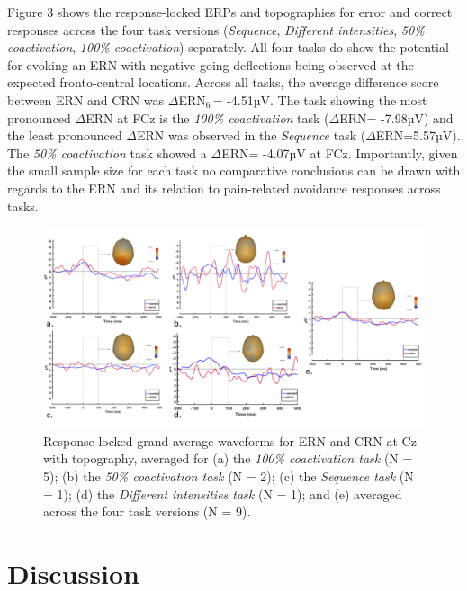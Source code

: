 \documentclass[twocolumn, serif, authordate, review]{jote-article}
\begin{document}
Figure 3 shows the response-locked ERPs and topographies for error and correct responses across the four task versions (\textit{Sequence}, \textit{Different intensities}, \textit{50\% coactivation}, \textit{100\% coactivation}) separately. All four tasks do show the potential for evoking an ERN with negative going deflections being observed at the expected fronto-central locations. Across all tasks, the average difference score between ERN and CRN was $\Delta$ERN${}_{6\ }$= -4.51µV. The task showing the most pronounced $\Delta$ERN at FCz is the \textit{100\% coactivation} task ($\Delta$ERN= -7.98µV) and the least pronounced $\Delta$ERN was observed in the \textit{Sequence} task ($\Delta$ERN=5.57µV). The \textit{50\% coactivation} task showed a $\Delta$ERN= -4.07µV at FCz. Importantly, given the small sample size for each task no comparative conclusions can be drawn with regards to the ERN and its relation to pain-related avoidance responses across tasks.~

\begin{figure}
    \centering
    \includegraphics[width=\textwidth]{articles/empirical/traxler/figure3.png}
    \caption{Response-locked grand average waveforms for ERN and CRN at Cz with topography, averaged for (a) the \emph{100\% coactivation task} (N = 5); (b) the \emph{50\% coactivation task} (N = 2); (c) the \emph{Sequence task} (N = 1); (d) the \emph{Different intensities task}
(N = 1); and (e) averaged across the four task versions (N = 9).}
    \label{fig:3}
\end{figure}


{}
\section*{Discussion} 
\gotoreview
\label{sec:discussion}
\end{document}
